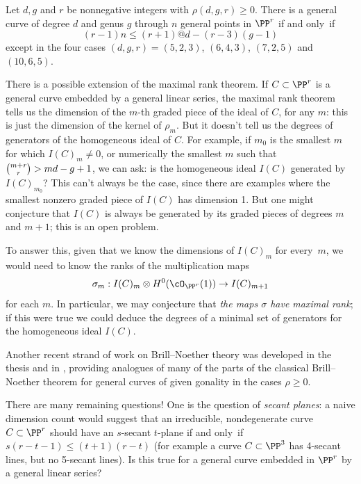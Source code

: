\begin{npt}
\begin{theorem}[\cite{MR4653767}]\label{Larson-Vogt}
Let $d, g$ and $r$
be nonnegative integers with $\rho(d, g, r) \geq 0$. There is a general
curve of degree $d$ and genus $g$ through $n$ general
points in $\PP^r$
if and only~if
$$
(r-1)n \leq (r + 1)@d-(r-3)(g-1)
$$
except in the four cases $(d, g, r) = (5, 2, 3)$,
$(6, 4, 3)$, $(7, 2, 5)$ and $(10, 6, 5)$.
 \end{theorem}
\end{npt}

There is a possible extension of the maximal rank theorem. If $C
\subset \PP^r$ is a general curve embedded by a general linear series,
the maximal rank theorem tells us the dimension of the $m$-th graded
piece of the ideal of $C$, for any $m$: this is just the dimension of
the kernel of $\rho_m$. But it doesn't tell us the degrees of
%
generators of the homogeneous ideal of $C$. For example, if $m_0$ is
the smallest $m$ for which $I(C)_m \neq 0$, or numerically the
smallest $m$ such that $\tbinom{m+r}{r} > md-g+1$, we can ask: is the
homogeneous ideal $I(C)$ generated by $I(C)_{m_0}$? This can't always
be the case, since
there are examples where the  smallest nonzero graded piece of $I(C)$ has
dimension 1. But one might conjecture that $I(C)$ is always be generated
by its graded pieces of degrees $m$ and $m+1$; this is an open problem.

To answer this, given that we know the dimensions of $I(C)_m$ for
every~$m$, we would need to know the ranks of the multiplication
maps
$$
\sigma_m : I(C)_m \otimes H^0(\cO_{\PP^r}(1)) \to I(C)_{m+1}
$$
for each $m$. In particular, we may conjecture that \emph{the maps
$\sigma$ have maximal rank}; if this were true we could deduce the
%
degrees of a minimal set of generators for the homogeneous ideal $I(C)$.

Another recent strand of work on Brill--Noether theory was developed in
the thesis
\cite{HLarson} and in \cite{arXiv:2008.10765}, providing  analogues of
many of the parts of the classical Brill--Noether theorem
%
%
%
for general curves of given gonality in the cases $\rho\geq 0$.


There are many remaining questions! One is the question of \emph{secant
planes}: a naive dimension count would suggest that an irreducible,
nondegenerate curve $C \subset \PP^r$ should have an $s$-secant $t$-plane
if and only~if $s(r-t-1) \leq (t+1)(r-t)$
(for example a curve $C \subset \PP^3$ has 4-secant lines, but no
5-secant lines). Is this true for a general curve embedded in $\PP^r$
by a general linear series?

